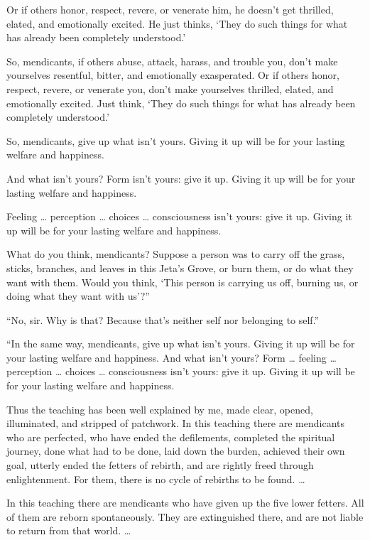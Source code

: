 \documentclass[12pt,openany]{book}%
\begin{document}
Or if others honor, respect, revere, or venerate him, he doesn’t get thrilled, elated, and emotionally excited. He just thinks, ‘They do such things for what has already been completely understood.’ 

So, mendicants, if others abuse, attack, harass, and trouble you, don’t make yourselves resentful, bitter, and emotionally exasperated. Or if others honor, respect, revere, or venerate you, don’t make yourselves thrilled, elated, and emotionally excited. Just think, ‘They do such things for what has already been completely understood.’ 

So, mendicants, give up what isn't yours. Giving it up will be for your lasting welfare and happiness. 

And what isn’t yours? Form isn’t yours: give it up. Giving it up will be for your lasting welfare and happiness. 

Feeling … perception … choices … consciousness isn’t yours: give it up. Giving it up will be for your lasting welfare and happiness. 

What do you think, mendicants? Suppose a person was to carry off the grass, sticks, branches, and leaves in this Jeta’s Grove, or burn them, or do what they want with them. Would you think, ‘This person is carrying us off, burning us, or doing what they want with us’?” 

“No, sir. Why is that? Because that’s neither self nor belonging to self.” 

“In the same way, mendicants, give up what isn't yours. Giving it up will be for your lasting welfare and happiness. And what isn’t yours? Form … feeling … perception … choices … consciousness isn’t yours: give it up. Giving it up will be for your lasting welfare and happiness. 

Thus the teaching has been well explained by me, made clear, opened, illuminated, and stripped of patchwork. In this teaching there are mendicants who are perfected, who have ended the defilements, completed the spiritual journey, done what had to be done, laid down the burden, achieved their own goal, utterly ended the fetters of rebirth, and are rightly freed through enlightenment. For them, there is no cycle of rebirths to be found. … 

In this teaching there are mendicants who have given up the five lower fetters. All of them are reborn spontaneously. They are extinguished there, and are not liable to return from that world. … 
\end{document}
